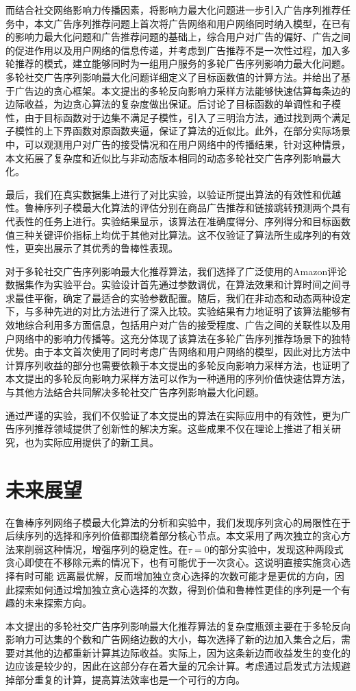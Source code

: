 而结合社交网络影响力传播因素，将影响力最大化问题进一步引入广告序列推荐任务中，本文广告序列推荐问题上首次将广告网络和用户网络同时纳入模型，在已有的影响力最大化问题和广告推荐问题的基础上，综合用户对广告的偏好、广告之间的促进作用以及用户网络的信息传递，并考虑到广告推荐不是一次性过程，加入多轮推荐的模式，建立能够同时为一组用户服务的多轮广告序列影响力最大化问题。多轮社交广告序列影响最大化问题详细定义了目标函数值的计算方法。并给出了基于广告边的贪心框架。本文提出的多轮反向影响力采样方法能够快速估算每条边的边际收益，为边贪心算法的复杂度做出保证。后讨论了目标函数的单调性和子模性，由于目标函数对于边集不满足子模性，引入了三明治方法，通过找到两个满足子模性的上下界函数对原函数夹逼，保证了算法的近似比。此外，在部分实际场景中，可以观测用户对广告的接受情况和在用户网络中的传播结果，针对这种情景，本文拓展了复杂度和近似比与非动态版本相同的动态多轮社交广告序列影响最大化。

最后，我们在真实数据集上进行了对比实验，以验证所提出算法的有效性和优越性。鲁棒序列子模最大化算法的评估分别在商品广告推荐和链接跳转预测两个具有代表性的任务上进行。实验结果显示，该算法在准确度得分、序列得分和目标函数值三种关键评价指标上均优于其他对比算法。这不仅验证了算法所生成序列的有效性，更突出展示了其优秀的鲁棒性表现。

对于多轮社交广告序列影响最大化推荐算法，我们选择了广泛使用的Amazon评论数据集作为实验平台。实验设计首先通过参数调优，在算法效果和计算时间之间寻求最佳平衡，确定了最适合的实验参数配置。随后，我们在非动态和动态两种设定下，与多种先进的对比方法进行了深入比较。实验结果有力地证明了该算法能够有效地综合利用多方面信息，包括用户对广告的接受程度、广告之间的关联性以及用户网络中的影响力传播等。这充分体现了该算法在多轮广告序列推荐场景下的独特优势。由于本文首次使用了同时考虑广告网络和用户网络的模型，因此对比方法中计算序列收益的部分也需要依赖于本文提出的多轮反向影响力采样方法，也证明了本文提出的多轮反向影响力采样方法可以作为一种通用的序列价值快速估算方法，与其他方法结合共同解决多轮社交广告序列影响最大化问题。

通过严谨的实验，我们不仅验证了本文提出的算法在实际应用中的有效性，更为广告序列推荐领域提供了创新性的解决方案。这些成果不仅在理论上推进了相关研究，也为实际应用提供了的新工具。

\section{未来展望}

在鲁棒序列网络子模最大化算法的分析和实验中，我们发现序列贪心的局限性在于后续序列的选择和序列价值都围绕着部分核心节点。本文采用了两次独立的贪心方法来削弱这种情况，增强序列的稳定性。在$\tau=0$的部分实验中，发现这种两段式贪心即使在不移除元素的情况下，也有可能优于一次贪心。这说明直接实施贪心选择有时可能
远离最优解，反而增加独立贪心选择的次数可能才是更优的方向，因此探索如何通过增加独立贪心选择的次数，得到价值和鲁棒性更佳的序列是一个有趣的未来探索方向。

本文提出的多轮社交广告序列影响最大化推荐算法的复杂度瓶颈主要在于多轮反向影响力可达集的个数和广告网络边数的大小，每次选择了新的边加入集合之后，需要对其他的边都重新计算其边际收益。实际上，因为这条新边而收益发生的变化的边应该是较少的，因此在这部分存在着大量的冗余计算。考虑通过启发式方法规避掉部分重复的计算，提高算法效率也是一个可行的方向。